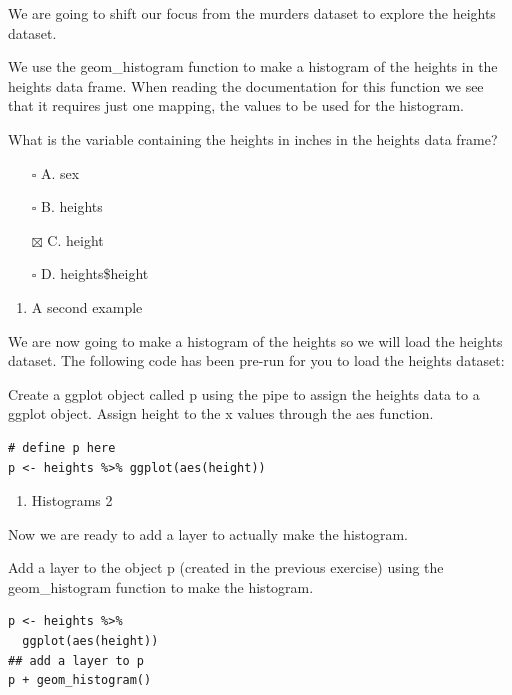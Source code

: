 \documentclass[
]{article}
\providecommand{\tightlist}{%
  \setlength{\itemsep}{0pt}\setlength{\parskip}{0pt}}
\begin{document}
We are going to shift our focus from the murders dataset to explore the
heights dataset.

We use the geom\_histogram function to make a histogram of the heights
in the heights data frame. When reading the documentation for this
function we see that it requires just one mapping, the values to be used
for the histogram.

What is the variable containing the heights in inches in the heights
data frame?

\begin{itemize}
\tightlist
\item[$\square$]
  A. sex
\item[$\square$]
  B. heights
\item[$\boxtimes$]
  C. height
\item[$\square$]
  D. heights\$height
\end{itemize}

\begin{enumerate}
\def\labelenumi{\arabic{enumi}.}
\setcounter{enumi}{15}
\tightlist
\item
  A second example
\end{enumerate}

We are now going to make a histogram of the heights so we will load the
heights dataset. The following code has been pre-run for you to load the
heights dataset:

Create a ggplot object called p using the pipe to assign the heights
data to a ggplot object. Assign height to the x values through the aes
function.

\begin{verbatim}
# define p here
p <- heights %>% ggplot(aes(height))
\end{verbatim}

\begin{enumerate}
\def\labelenumi{\arabic{enumi}.}
\setcounter{enumi}{16}
\tightlist
\item
  Histograms 2
\end{enumerate}

Now we are ready to add a layer to actually make the histogram.

Add a layer to the object p (created in the previous exercise) using the
geom\_histogram function to make the histogram.

\begin{verbatim}
p <- heights %>% 
  ggplot(aes(height))
## add a layer to p
p + geom_histogram()
\end{verbatim}
\end{document}
